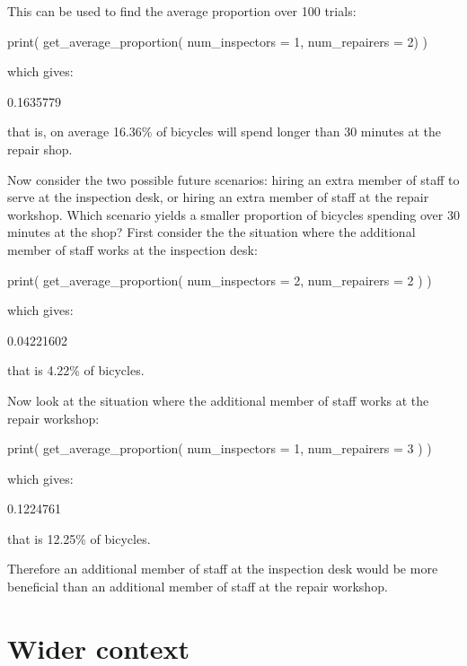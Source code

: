 This can be used to find the average proportion over 100 trials:

\begin{Rin}
print(
  get_average_proportion(
    num_inspectors = 1,
    num_repairers = 2)
)
\end{Rin}

which gives:

\begin{Rout}
[1] 0.1635779
\end{Rout}

that is, on average 16.36\% of bicycles will spend longer than 30 minutes at the
repair shop.

Now consider the two possible future scenarios: hiring an
extra member of staff to serve at the inspection desk, or hiring an extra member
of staff at the repair workshop. Which scenario yields a smaller proportion of
bicycles spending over 30 minutes at the shop? First consider the
the situation where the additional member of staff works at the inspection desk:

\begin{Rin}
print(
  get_average_proportion(
    num_inspectors = 2,
    num_repairers = 2
  )
)
\end{Rin}

which gives:

\begin{Rout}
[1] 0.04221602
\end{Rout}

that is 4.22\% of bicycles.

Now look at the situation where the additional member of staff works at the
repair workshop:

\begin{Rin}
print(
  get_average_proportion(
    num_inspectors = 1,
    num_repairers = 3
  )
)
\end{Rin}

which gives:

\begin{Rout}
[1] 0.1224761
\end{Rout}

that is 12.25\% of bicycles.

Therefore an additional member of staff at the inspection desk would be more
beneficial than an additional member of staff at the repair workshop.

\section{Wider context}\label{sec:discrete_event_simulation_wider_context}


